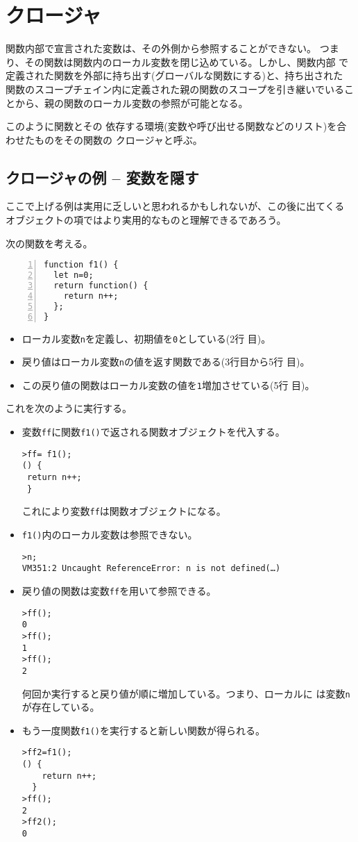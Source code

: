  \section{クロージャ}
関数内部で宣言された変数は、その外側から参照することができない。
つまり、その関数は関数内のローカル変数を閉じ込めている。しかし、関数内部
で定義された関数を外部に持ち出す(グローバルな関数にする)と、持ち出された
関数のスコープチェイン内に定義された親の関数のスコープを引き継いでいるこ
とから、親の関数のローカル変数の参照が可能となる。

このように関数とその
依存する環境(変数や呼び出せる関数などのリスト)を合わせたものをその関数の
クロージャと呼ぶ。

\subsection{クロージャの例 -- 変数を隠す}
ここで上げる例は実用に乏しいと思われるかもしれないが、この後に出てくる
オブジェクトの項ではより実用的なものと理解できるであろう。
\begin{Exec}\label{Closure1}\upshape
 次の関数を考える。
\begin{Verbatim}[numbers=left]
function f1() {
  let n=0;
  return function() {
    return n++;
  };
}
\end{Verbatim}
 \begin{itemize}\upshape
	\item ローカル変数\texttt{n}を定義し、初期値を\texttt{0}としている(2行
				目)。
	\item 戻り値はローカル変数\texttt{n}の値を返す関数である(3行目から5行
				目)。
	\item この戻り値の関数はローカル変数の値を\texttt{1}増加させている(5行
				目)。
 \end{itemize}
 これを次のように実行する。
 \begin{itemize}\upshape
	\item  変数\texttt{ff}に関数\texttt{f1()}で返される関数オブジェクトを代入する。
\begin{Verbatim}
>ff= f1();
() {
 return n++;
 }
\end{Verbatim}
	これにより変数\Verb+ff+は関数オブジェクトになる。
	\item \texttt{f1()}内のローカル変数は参照できない。
\begin{Verbatim}
>n;
VM351:2 Uncaught ReferenceError: n is not defined(…)
\end{Verbatim}
	\item 戻り値の関数は変数\texttt{ff}を用いて参照できる。
\begin{Verbatim}
>ff();
0
>ff();
1
>ff();
2
\end{Verbatim}
何回か実行すると戻り値が順に増加している。つまり、ローカルに
は変数\texttt{n}が存在している。
	\item もう一度関数\texttt{f1()}を実行すると新しい関数が得られる。
\begin{Verbatim}
>ff2=f1();
() {
    return n++;
  }
>ff();
2
>ff2();
0
\end{Verbatim}
 \end{itemize}
\end{Exec}
